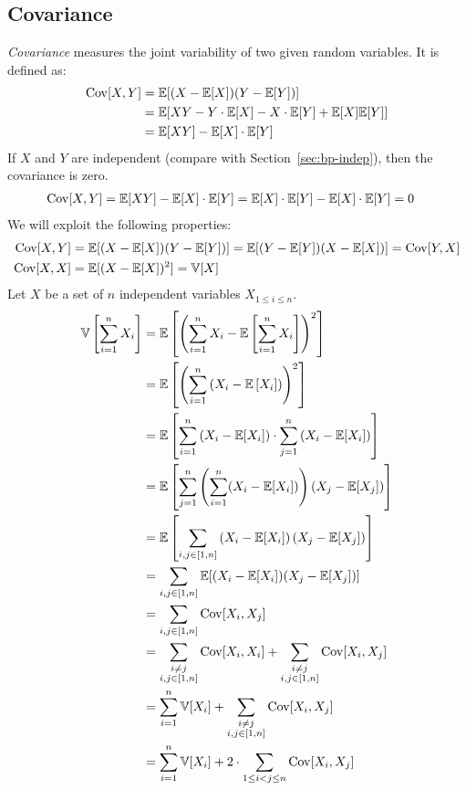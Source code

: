 \subsection{Covariance}
\label{sec:covar}
%
\emph{Covariance} measures the joint variability of two given random variables.
It is defined as:
\begin{align}
  \operatorname{Cov}[X,Y]
    &= \mathbb E[(X - \mathbb E[X])(Y - \mathbb E[Y])] \label{eq:cov}\\
    &= \mathbb E[XY - Y\cdot\mathbb E[X] - X\cdot\mathbb E[Y] + \mathbb E[X]\mathbb E[Y]] \notag\\
    &= \mathbb E[XY] - \mathbb E[X]\cdot\mathbb E[Y] \label{eq:cov-exy}
\end{align}
%
If $X$ and $Y$ are independent (compare with Section~\ref{sec:bp-indep}), then the covariance is zero.
\begin{align}
  \operatorname{Cov}[X,Y] &= \mathbb E[XY] - \mathbb E[X] \cdot \mathbb E[Y] = \mathbb E[X] \cdot \mathbb E[Y] - \mathbb E[X] \cdot \mathbb E[Y] = 0 \label{eq:CovXY0}
\end{align}
We will exploit the following properties:
\begin{align}
  \operatorname{Cov}[X,Y] &= \mathbb E[(X - \mathbb E[X])(Y - \mathbb E[Y])] = \mathbb E[(Y - \mathbb E[Y])(X - \mathbb E[X])] = \operatorname{Cov}[Y,X] \\
  \operatorname{Cov}[X,X] &= \mathbb E[(X - \mathbb E[X])^2] = \mathbb V[X]
\end{align}
%
Let $X$ be a set of $n$ independent variables $X_{1 \leq i \leq n}$.
\begin{align}
  \mathbb V\left[\sum_{i=1}^n X_i\right]
    &= \mathbb E\left[\left(\sum_{i=1}^n X_i - \mathbb E\left[\sum_{i=1}^n X_i\right]\right)^2\right] \notag \\
    &= \mathbb E\left[\left(\sum_{i=1}^n \left(X_i - \mathbb E\left[X_i\right]\right)\right)^2\right] \notag \\
    &= \mathbb E\left[\sum_{i=1}^n \left(X_i - \mathbb E[X_i]\right) \cdot \sum_{j=1}^n \left(X_i - \mathbb E[X_i]\right)\right] \notag \\
    &= \mathbb E\left[\sum_{j=1}^n \left(\sum_{i=1}^n (X_i - \mathbb E[X_i])\right) (X_j - \mathbb E[X_j]) \right] \notag \\
    &= \mathbb E\left[\sum_{i,j \in [1,n]} \left(X_i - \mathbb E[X_i]\right) \left(X_j - \mathbb E[X_j]\right)\right] \notag \\
    &= \sum_{i,j \in [1,n]} \mathbb E[(X_i - \mathbb E[X_i])(X_j - \mathbb E[X_j])] \notag \\
    &= \sum_{i,j \in [1,n]} \operatorname{Cov}[X_i, X_j] \notag \\
    &= \sum_{\substack{i \neq j \\ i,j \in [1,n]}} \operatorname{Cov}[X_i, X_i] + \sum_{\substack{i \neq j \\ i,j \in [1,n]}} \operatorname{Cov}[X_i, X_j] \notag \\
    &= \sum_{i=1}^n \mathbb V[X_i] + \sum_{\substack{i \neq j \\ i,j \in [1,n]}} \operatorname{Cov}[X_i, X_j] \notag \\
    &= \sum_{i=1}^n \mathbb V[X_i] + 2 \cdot \sum_{1 \leq i < j \leq n} \operatorname{Cov}[X_i, X_j] \label{eq:sumVarCov}
\end{align}

